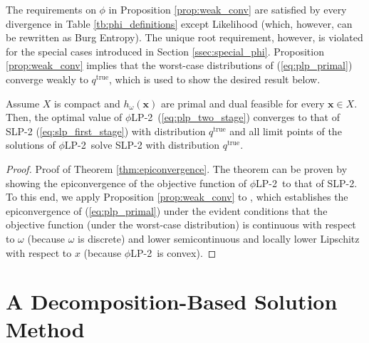 \documentclass[opre,nonblindrev]{informs3} %
\newcommand{\x}{\mathbf{x}}
\newcommand{\qtrue}{q^{\text{true}}}
\newcommand{\plp}{$\phi$LP-2}
\begin{document}
The requirements on $\phi$ in Proposition \ref{prop:weak_conv} are satisfied by every divergence in Table \ref{tb:phi_definitions} except Likelihood (which, however, can be rewritten as Burg Entropy).
The unique root requirement, however, is violated for the special cases introduced in Section \ref{ssec:special_phi}.
Proposition \ref{prop:weak_conv} implies that the worst-case distributions of (\ref{eq:plp_primal}) converge weakly to $\qtrue$, which is used to show the desired result below. 
\begin{theorem}
	\label{thm:epiconvergence}
	Assume $X$ is compact and $h_\omega(\x)$ are primal and dual feasible for every $\x \in X$.
	Then, the optimal value of \plp\ (\ref{eq:plp_two_stage}) converges to that of SLP-2 (\ref{eq:slp_first_stage}) with distribution $\qtrue$ and all limit points of the solutions of \plp\ solve SLP-2 with distribution $\qtrue$.
\end{theorem}

\begin{proof}{\sc Proof of Theorem \ref{thm:epiconvergence}.}
	The theorem can be proven by showing the epiconvergence of the objective function of \plp\ to that of SLP-2.
    To this end, we apply Proposition \ref{prop:weak_conv} to \citep[Theorem 3.7]{dupacova1988asymptotic}, which establishes the epiconvergence of (\ref{eq:plp_primal}) under the evident conditions that the objective function (under the worst-case distribution) is continuous with respect to $\omega$ (because $\omega$ is discrete) and lower semicontinuous and locally lower Lipschitz with respect to $x$ (because \plp\ is convex).
    \Halmos
\end{proof}

\section{A Decomposition-Based Solution Method}
\label{sec:soln_algorithm}
\end{document}
